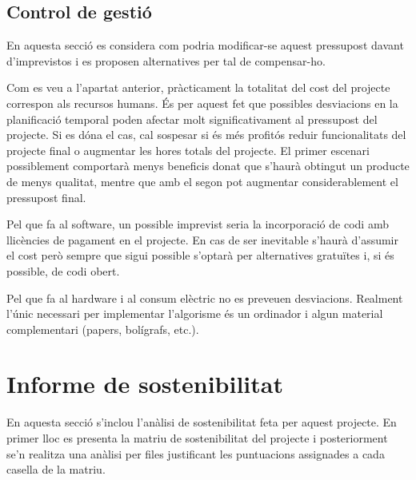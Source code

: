 \subsection{Control de gestió}
\label{control}

En aquesta secció es considera com podria modificar-se aquest pressupost davant d'imprevistos i es proposen alternatives per tal de compensar-ho.

Com es veu a l'apartat anterior, pràcticament la totalitat del cost del projecte correspon als recursos humans. És per aquest fet que possibles desviacions en la planificació temporal poden afectar molt significativament al pressupost del projecte. Si es dóna el cas, cal sospesar si és més profitós reduir funcionalitats del projecte final o augmentar les hores totals del projecte. El primer escenari possiblement comportarà menys beneficis donat que s'haurà obtingut un producte de menys qualitat, mentre que amb el segon pot augmentar considerablement el pressupost final.

Pel que fa al software, un possible imprevist seria la incorporació de codi amb llicències de pagament en el projecte. En cas de ser inevitable s'haurà d'assumir el cost però sempre que sigui possible s'optarà per alternatives gratuïtes i, si és possible, de codi obert.

Pel que fa al hardware i al consum elèctric no es preveuen desviacions. Realment l'únic necessari per implementar l'algorisme és un ordinador i algun material complementari (papers, bolígrafs, etc.).



\section{Informe de sostenibilitat}

En aquesta secció s'inclou l'anàlisi de sostenibilitat feta per aquest projecte. En primer lloc es presenta la matriu de sostenibilitat del projecte i posteriorment se'n realitza una anàlisi per files justificant les puntuacions assignades a cada casella de la matriu.

